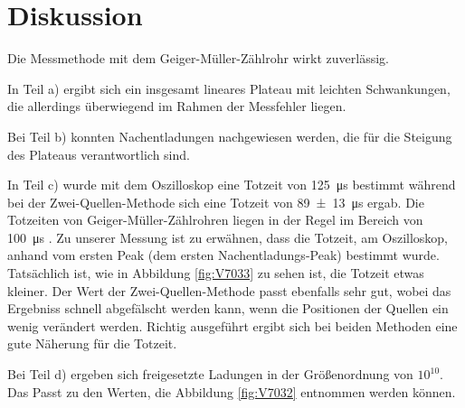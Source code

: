 \documentclass[
  bibliography=totoc,     %
  captions=tableheading,  %
  titlepage=firstiscover, %
]{scrartcl}
\begin{document}
\section{Diskussion}
\label{sec:diskussion}
Die Messmethode mit dem Geiger-Müller-Zählrohr wirkt zuverlässig.

\noindent
In Teil a) ergibt sich ein insgesamt lineares Plateau mit leichten Schwankungen,
die allerdings überwiegend im Rahmen der Messfehler liegen.

\noindent
Bei Teil b) konnten Nachentladungen nachgewiesen werden, die für die Steigung
des Plateaus verantwortlich sind.

\noindent
In Teil c) wurde mit dem Oszilloskop eine Totzeit von \SI{125}{\micro\second} bestimmt
während bei der Zwei-Quellen-Methode sich eine Totzeit von \SI{89(13)}{\micro\second}
ergab. Die Totzeiten von Geiger-Müller-Zählrohren liegen in der Regel im Bereich
von \SI{100}{\micro\second} \cite{geigerwiki}.
Zu unserer Messung ist zu erwähnen, dass die Totzeit, am Oszilloskop, anhand vom ersten
Peak (dem ersten Nachentladungs-Peak) bestimmt wurde. Tatsächlich ist, wie in Abbildung
\ref{fig:V7033} zu sehen ist, die Totzeit etwas kleiner. Der Wert der Zwei-Quellen-Methode
passt ebenfalls sehr gut, wobei das Ergebniss schnell abgefälscht werden kann, wenn die
Positionen der Quellen ein wenig verändert werden.
Richtig ausgeführt ergibt sich bei beiden Methoden eine gute Näherung für
die Totzeit.

\noindent
Bei Teil d) ergeben sich freigesetzte Ladungen in der Größenordnung von $10^{10}$.
Das Passt zu den Werten, die Abbildung \ref{fig:V7032} entnommen werden können.
\nocite{*}
\printbibliography
\end{document}
